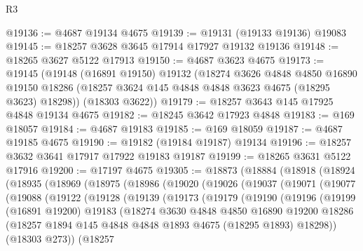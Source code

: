 \begin{lexlean}{R3}
\begin{coremodule}
@19136 := @4687 @19134 @4675
@19139 := @19131 (@19133 @19136) @19083
@19145 := @18257 @3628 @3645 @17914 @17927 @19132 @19136
@19148 := @18265 @3627 @5122 @17913
@19150 := @4687 @3623 @4675
@19173 := @19145
    (@19148
      (@16891 @19150)
      @19132
      (@18274
        @3626
        @4848
        @4850
        @16890
        @19150
        @18286
        (@18257 @3624 @145 @4848 @4848 @3623 @4675 (@18295 @3623) @18298))
      (@18303 @3622))
@19179 := @18257 @3643 @145 @17925 @4848 @19134 @4675
@19182 := @18245 @3642 @17923 @4848
@19183 := @169 @18057
@19184 := @4687 @19183
@19185 := @169 @18059
@19187 := @4687 @19185 @4675
@19190 := @19182 (@19184 @19187) @19134
@19196 := @18257 @3632 @3641 @17917 @17922 @19183 @19187
@19199 := @18265 @3631 @5122 @17916
@19200 := @17197 @4675
@19305 := @18873
    (@18884
      (@18918
        (@18924
          (@18935
            (@18969
              (@18975
                (@18986
                  (@19020
                    (@19026
                      (@19037
                        (@19071
                          (@19077
                            (@19088
                              (@19122
                                (@19128
                                  (@19139
                                    (@19173
                                      (@19179
                                        (@19190
                                          (@19196
                                            (@19199
                                              (@16891 @19200)
                                              @19183
                                              (@18274
                                                @3630
                                                @4848
                                                @4850
                                                @16890
                                                @19200
                                                @18286
                                                (@18257
                                                  @1894
                                                  @145
                                                  @4848
                                                  @4848
                                                  @1893
                                                  @4675
                                                  (@18295 @1893)
                                                  @18298))
                                              (@18303 @273))
                                            (@18257

\end{coremodule}
\end{lexlean}
